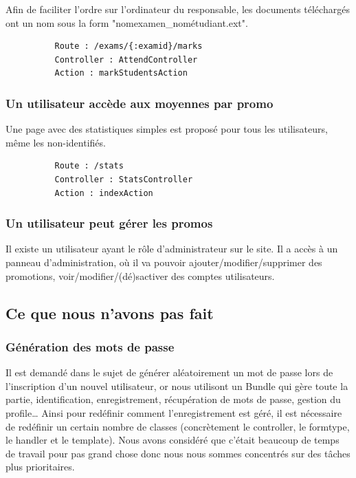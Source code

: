\documentclass{report}
\begin{document}
        Afin de faciliter l'ordre sur l'ordinateur du responsable, les documents
        téléchargés ont un nom sous la form "nomexamen\_nométudiant.ext".

        \begin{verbatim}
          Route : /exams/{:examid}/marks
          Controller : AttendController
          Action : markStudentsAction
        \end{verbatim}
      \subsubsection{Un utilisateur accède aux moyennes par promo}
        Une page avec des statistiques simples est proposé pour tous les utilisateurs,
        même les non-identifiés.

        \begin{verbatim}
          Route : /stats
          Controller : StatsController
          Action : indexAction
        \end{verbatim}
      \subsubsection{Un utilisateur peut gérer les promos}
        Il existe un utilisateur ayant le rôle d'administrateur sur le site. Il
        a accès à un panneau d'administration, où il va pouvoir 
        ajouter/modifier/supprimer des promotions, voir/modifier/(dé)sactiver des
        comptes utilisateurs.
    \subsection{Ce que nous n'avons pas fait}
      \subsubsection{Génération des mots de passe}
        Il est demandé dans le sujet de générer aléatoirement un mot de passe lors 
        de l'inscription d'un nouvel utilisateur, or nous utilisont un Bundle qui 
        gère toute la partie, identification, enregistrement, récupération de mots
        de passe, gestion du profile… Ainsi pour redéfinir comment l'enregistrement
        est géré, il est nécessaire de redéfinir un certain nombre de classes
        (concrètement le controller, le formtype, le handler et le template). Nous
        avons considéré que c'était beaucoup de temps de travail pour pas grand
        chose donc nous nous sommes concentrés sur des tâches plus prioritaires.
       
\end{document}
